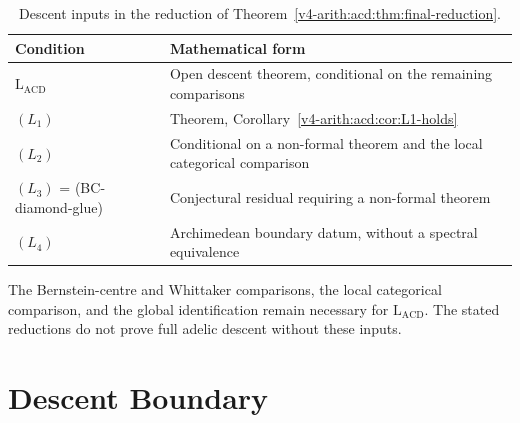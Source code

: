 \begin{table}[h]
\centering
\small
\begin{tabular}{@{}>{\raggedright\arraybackslash}p{}|>{\raggedright\arraybackslash}p{}@{}}
Condition & Mathematical form \\
\hline
\(\mathrm{L}_{\mathrm{ACD}}\) & Open descent theorem, conditional on the remaining comparisons \\
\((L_{1})\) & Theorem, Corollary~\ref{v4-arith:acd:cor:L1-holds} \\
\((L_{2})\) & Conditional on a non-formal theorem and the local categorical comparison \\
\((L_{3})\) = (BC-diamond-glue) & Conjectural residual requiring a non-formal theorem \\
\((L_{4})\) & Archimedean boundary datum, without a spectral equivalence \\
\end{tabular}
\caption{Descent inputs in the reduction of
Theorem~\ref{v4-arith:acd:thm:final-reduction}.}
\label{v4-arith:acd:table:revised-domain}
\end{table}

The Bernstein-centre and Whittaker comparisons, the local categorical
comparison, and the global identification remain necessary for
\(\mathrm{L}_{\mathrm{ACD}}\). The stated reductions do not prove
full adelic descent without these inputs.

\section{Descent Boundary}
\label{v4-arith:acd:summary}


